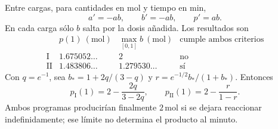 Entre cargas, para cantidades en mol y tiempo en min,
\[
a'=-ab,\qquad b'=-ab,\qquad p'=ab.
\]
En cada carga sólo \(b\) salta por la dosis añadida. Los resultados son
\[
\begin{array}{c|cc|c}
& p(1)\ (\mathrm{mol})&\max_{[0,1]}b\ (\mathrm{mol})&\text{cumple ambos criterios}\\\hline
\mathrm I&1.675052\ldots&2&\text{no}\\
\mathrm{II}&1.483806\ldots&1.279530\ldots&\text{sí}
\end{array}
\]
Con \(q=e^{-1}\), sea \(b_*=1+2q/(3-q)\) y \(r=e^{-1/2}b_* /(1+b_*)\). Entonces
\[
p_{\mathrm I}(1)=2-\frac{2q}{3-2q},
\qquad p_{\mathrm{II}}(1)=2-\frac r{1-r}.
\]
Ambos programas producirían finalmente \(2\,\mathrm{mol}\) si se dejara reaccionar indefinidamente; ese límite no determina el producto al minuto.
